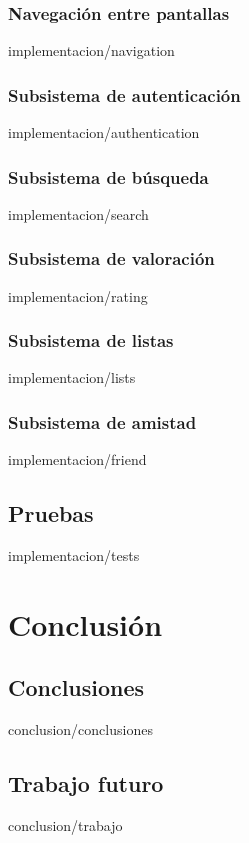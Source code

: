 \documentclass[epsbased,copyright,final,printable,covers,extendedindex,firstnumbered,tfg,gnuplot]{tfgtfmthesisuam}
\begin{document}
    \subsection{Navegación entre pantallas\label{SEC:NAVIGATION}}{implementacion/navigation}
    \subsection{Subsistema de autenticación\label{SEC:AUTHENTICATION}}{implementacion/authentication}
    \subsection{Subsistema de búsqueda\label{SEC:SEARCH}}{implementacion/search}
    \subsection{Subsistema de valoración\label{SEC:RATING}}{implementacion/rating}
    \subsection{Subsistema de listas\label{SEC:LISTS}}{implementacion/lists}
    \subsection{Subsistema de amistad\label{SEC:ADMINISTRATION}}{implementacion/friend}
  \section{Pruebas\label{SEC:TESTS}}{implementacion/tests}
\chapter{Conclusión\label{CAP:CONCLUSION}}{}
  \section{Conclusiones\label{SEC:CONCLUSIONES}}{conclusion/conclusiones}
  \section{Trabajo futuro\label{SEC:TRABAJO}}{conclusion/trabajo}
\end{document}
